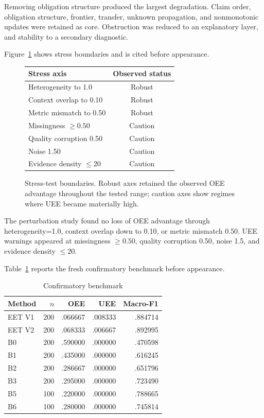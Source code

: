 \documentclass[journal]{IEEEtran}
\begin{document}
Removing obligation structure produced the largest degradation. Claim order, obligation structure, frontier, transfer, unknown propagation, and nonmonotonic updates were retained as core. Obstruction was reduced to an explanatory layer, and stability to a secondary diagnostic.

Figure~\ref{fig:stress} shows stress boundaries and is cited before appearance.
\begin{figure}[H]
\centering
\setlength{\tabcolsep}{3pt}
\begin{tabular}{lc}
\toprule
Stress axis & Observed status\\
\midrule
Heterogeneity to 1.0 & Robust\\
Context overlap to 0.10 & Robust\\
Metric mismatch to 0.50 & Robust\\
Missingness $\geq 0.50$ & Caution\\
Quality corruption 0.50 & Caution\\
Noise 1.50 & Caution\\
Evidence density $\leq 20$ & Caution\\
\bottomrule
\end{tabular}
\caption{Stress-test boundaries. Robust axes retained the observed OEE advantage throughout the tested range; caution axes show regimes where UEE became materially high.}
\label{fig:stress}
\end{figure}

The perturbation study found no loss of OEE advantage through heterogeneity=1.0, context overlap down to 0.10, or metric mismatch 0.50. UEE warnings appeared at missingness $\geq0.50$, quality corruption 0.50, noise 1.5, and evidence density $\leq20$.

Table~\ref{tab:confirmatory} reports the fresh confirmatory benchmark before appearance.
\begin{table}[H]\caption{Confirmatory benchmark}\label{tab:confirmatory}\centering\footnotesize
\begin{tabular}{lrrrr}\toprule Method & $n$ & OEE & UEE & Macro-F1\\\midrule
EET V1 & 200 & .066667 & .008333 & .884714\\
EET V2 & 200 & .068333 & .006667 & .892995\\
B0 & 200 & .590000 & .000000 & .470598\\
B1 & 200 & .435000 & .000000 & .616245\\
B2 & 200 & .286667 & .000000 & .651796\\
B3 & 200 & .295000 & .000000 & .723490\\
B5 & 100 & .220000 & .000000 & .788665\\
B6 & 100 & .280000 & .000000 & .745814\\\bottomrule\end{tabular}\end{table}
\end{document}

